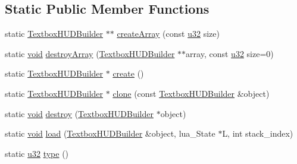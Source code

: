 \subsection*{Static Public Member Functions}
\begin{DoxyCompactItemize}
\item 
static \mbox{\hyperlink{classnjli_1_1_textbox_h_u_d_builder}{Textbox\+H\+U\+D\+Builder}} $\ast$$\ast$ \mbox{\hyperlink{classnjli_1_1_textbox_h_u_d_builder_a9bfdc5e1e870ef42663fd7d8a85bcfe7}{create\+Array}} (const \mbox{\hyperlink{_util_8h_a10e94b422ef0c20dcdec20d31a1f5049}{u32}} size)
\item 
static \mbox{\hyperlink{_thread_8h_af1e856da2e658414cb2456cb6f7ebc66}{void}} \mbox{\hyperlink{classnjli_1_1_textbox_h_u_d_builder_abd9e00950d569b8a887bbac1ee1356de}{destroy\+Array}} (\mbox{\hyperlink{classnjli_1_1_textbox_h_u_d_builder}{Textbox\+H\+U\+D\+Builder}} $\ast$$\ast$array, const \mbox{\hyperlink{_util_8h_a10e94b422ef0c20dcdec20d31a1f5049}{u32}} size=0)
\item 
static \mbox{\hyperlink{classnjli_1_1_textbox_h_u_d_builder}{Textbox\+H\+U\+D\+Builder}} $\ast$ \mbox{\hyperlink{classnjli_1_1_textbox_h_u_d_builder_a31b502c61f888b033d195d5a9f9e0ad9}{create}} ()
\item 
static \mbox{\hyperlink{classnjli_1_1_textbox_h_u_d_builder}{Textbox\+H\+U\+D\+Builder}} $\ast$ \mbox{\hyperlink{classnjli_1_1_textbox_h_u_d_builder_a3470cc221f74b8d1e03d52a948ebae83}{clone}} (const \mbox{\hyperlink{classnjli_1_1_textbox_h_u_d_builder}{Textbox\+H\+U\+D\+Builder}} \&object)
\item 
static \mbox{\hyperlink{_thread_8h_af1e856da2e658414cb2456cb6f7ebc66}{void}} \mbox{\hyperlink{classnjli_1_1_textbox_h_u_d_builder_a51889c0d7cc39582491aa0a6773c896b}{destroy}} (\mbox{\hyperlink{classnjli_1_1_textbox_h_u_d_builder}{Textbox\+H\+U\+D\+Builder}} $\ast$object)
\item 
static \mbox{\hyperlink{_thread_8h_af1e856da2e658414cb2456cb6f7ebc66}{void}} \mbox{\hyperlink{classnjli_1_1_textbox_h_u_d_builder_ae77874c2e0d495bdc02682f7f9d6faf2}{load}} (\mbox{\hyperlink{classnjli_1_1_textbox_h_u_d_builder}{Textbox\+H\+U\+D\+Builder}} \&object, lua\+\_\+\+State $\ast$L, int stack\+\_\+index)
\item 
static \mbox{\hyperlink{_util_8h_a10e94b422ef0c20dcdec20d31a1f5049}{u32}} \mbox{\hyperlink{classnjli_1_1_textbox_h_u_d_builder_ae56de0f25a73f5126f1f133943c42464}{type}} ()
\end{DoxyCompactItemize}

